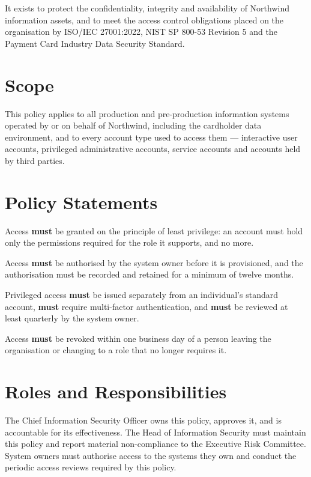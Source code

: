 \documentclass[11pt,a4paper]{article}
\begin{document}
It exists to protect the confidentiality, integrity and availability of
Northwind information assets, and to meet the access control obligations placed
on the organisation by ISO/IEC 27001:2022, NIST SP 800-53 Revision 5 and the
Payment Card Industry Data Security Standard.

\section{Scope}
This policy applies to all production and pre-production information systems
operated by or on behalf of Northwind, including the cardholder data
environment, and to every account type used to access them --- interactive user
accounts, privileged administrative accounts, service accounts and accounts held
by third parties.

\section{Policy Statements}
Access \textbf{must} be granted on the principle of least privilege: an account
must hold only the permissions required for the role it supports, and no more.

Access \textbf{must} be authorised by the system owner before it is provisioned,
and the authorisation must be recorded and retained for a minimum of twelve
months.

Privileged access \textbf{must} be issued separately from an individual's
standard account, \textbf{must} require multi-factor authentication, and
\textbf{must} be reviewed at least quarterly by the system owner.

Access \textbf{must} be revoked within one business day of a person leaving the
organisation or changing to a role that no longer requires it.

\section{Roles and Responsibilities}
The Chief Information Security Officer owns this policy, approves it, and is
accountable for its effectiveness. The Head of Information Security must
maintain this policy and report material non-compliance to the Executive Risk
Committee. System owners must authorise access to the systems they own and
conduct the periodic access reviews required by this policy.
\end{document}
